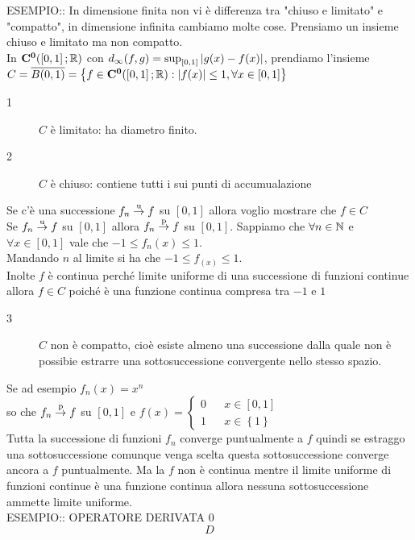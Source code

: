 ESEMPIO:: In dimensione finita non vi è differenza tra "chiuso e limitato" e "compatto", in dimensione infinita cambiamo molte cose.
Prensiamo un insieme chiuso e limitato ma non compatto.\\
In $\mathbf{C^{0}}(\left[0,1\right]; \mathbb{R})$ con $d_\infty(f,g)=\sup_{\left[0,1\right]}\left|g(x)-f(x)\right|$, prendiamo l'insieme $C=\overline{B(0,1)}=\left\{f\in \mathbf{C^{0}}(\left[0,1\right]; \mathbb{R}):\left|f(x)\right|\le 1, \forall x \in\left[0,1\right]\right\}$
\begin{description}
	\item[1] $C$ è limitato: ha diametro finito.
	\item[2] $C$ è chiuso: contiene tutti i sui punti di accumualazione
\end{description}
Se c'è una successione $f_n \overset{\text{u}}{\to} f$ su $\left[0,1\right]$ allora voglio mostrare che $f\in C$\\
Se $f_n \overset{\text{u}}{\to} f$ su $\left[0,1\right]$ allora $f_n \overset{\text{p}}{\to} f$ su $\left[0,1\right]$.
Sappiamo che $\forall n\in\mathbb{N}$ e $\forall x\in \left[0,1\right]$ vale che $-1\le f_n(x)\le 1$.\\
Mandando $n$ al limite si ha che $-1\le f_(x)\le 1$.\\
Inolte $f$ è continua perché limite uniforme di una successione di funzioni continue allora $f\in C$ poiché è una funzione continua compresa tra $-1$ e $1$
\begin{description}
	\item[3] $C$ non è compatto, cioè esiste almeno una successione dalla quale non è possibie estrarre una sottosuccessione convergente nello stesso spazio.
\end{description}
Se ad esempio $f_n(x) = x^n$\\
so che $f_n \overset{\text{p}}{\to} f$ su $\left[0,1\right]$ e $f(x)=\left\{\begin{matrix}0&&x\in\left[0,1\right]\\1&&x\in\left\{1\right\}\end{matrix}\right.$\\
Tutta la successione di funzioni $f_n$ converge puntualmente a $f$ quindi se estraggo una sottosuccessione comunque venga scelta questa sottosuccessione converge ancora a $f$ puntualmente. Ma la $f$ non è continua mentre il limite uniforme di funzioni continue è una funzione continua allora nessuna sottosuccessione ammette limite uniforme.\\

ESEMPIO:: OPERATORE DERIVATA 0\\
\[D\]

